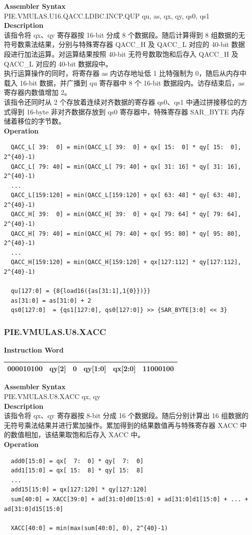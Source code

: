 \textbf{Assembler Syntax} \\
PIE.VMULAS.U16.QACC.LDBC.INCP.QUP qu, as, qx, qy, qs0, qs1 \\
\textbf{Description} \\
该指令将 qx、qy 寄存器按 16-bit 分成 8 个数据段。随后计算得到 8 组数据的无符号数乘法结果，分别与特殊寄存器 QACC\_H 及 QACC\_L 对应的 40-bit 数据段进行加法运算。对运算结果按照 40-bit 无符号数取饱和后存入 QACC\_H 及 QACC\_L 对应的 40-bit 数据段中。\\
执行运算操作的同时，将寄存器 as 内访存地址低 1 比特强制为 0，随后从内存中载入 16-bit 数据，并广播到 qu 寄存器中 8 个 16-bit 数据段内。访存结束后，as 寄存器内数值增加 2。\\
该指令还同时从 2 个存放着连续对齐数据的寄存器 qs0、qs1 中通过拼接移位的方式得到 16-byte 非对齐数据存放到 qs0 寄存器中，特殊寄存器 SAR\_BYTE 内存储着移位的字节数。\\
\textbf{Operation}
\begin{lstlisting}
  QACC_L[ 39:  0] = min(QACC_L[ 39:  0] + qx[ 15:  0] * qy[ 15:  0], 2^{40}-1)
  QACC_L[ 79: 40] = min(QACC_L[ 79: 40] + qx[ 31: 16] * qy[ 31: 16], 2^{40}-1)
  ...
  QACC_L[159:120] = min(QACC_L[159:120] + qx[ 63: 48] * qy[ 63: 48], 2^{40}-1)
  QACC_H[ 39:  0] = min(QACC_H[ 39:  0] + qx[ 79: 64] * qy[ 79: 64], 2^{40}-1)
  QACC_H[ 79: 40] = min(QACC_H[ 79: 40] + qx[ 95: 80] * qy[ 95: 80], 2^{40}-1)
  ...
  QACC_H[159:120] = min(QACC_H[159:120] + qx[127:112] * qy[127:112], 2^{40}-1)

  qu[127:0] = {8{load16({as[31:1],1{0}})}}
  as[31:0] = as[31:0] + 2
  qs0[127:0]  = {qs1[127:0], qs0[127:0]} >> {SAR_BYTE[3:0] << 3}
\end{lstlisting}

\newpage
\subsubsection{PIE.VMULAS.U8.XACC}\label{instruction:PIEVMULASU8XACC}
\setlength\tabcolsep{6pt}
\textbf{Instruction Word} \\
\begin{tabular}{|c|c|c|c|c|c|}
	\hline
	000010100 & qy[2] & 0 & qy[1:0] & qx[2:0] & 11000100 \\
	\hline
\end{tabular}

\textbf{Assembler Syntax} \\
PIE.VMULAS.U8.XACC qx, qy \\
\textbf{Description} \\
该指令将 qx、qy 寄存器按 8-bit 分成 16 个数据段。随后分别计算出 16 组数据的无符号乘法结果并进行累加操作。累加得到的结果数值再与特殊寄存器 XACC 中的数值相加，该结果取饱和后存入 XACC 中。\\
\textbf{Operation}
\begin{lstlisting}
  add0[15:0] = qx[  7:  0] * qy[  7:  0]
  add1[15:0] = qx[ 15:  8] * qy[ 15:  8]
  ...
  add15[15:0] = qx[127:120] * qy[127:120]
  sum[40:0] = XACC[39:0] + ad[31:0]d0[15:0] + ad[31:0]d1[15:0] + ... + ad[31:0]d15[15:0]

  XACC[40:0] = min(max(sum[40:0], 0), 2^{40}-1)
\end{lstlisting}

